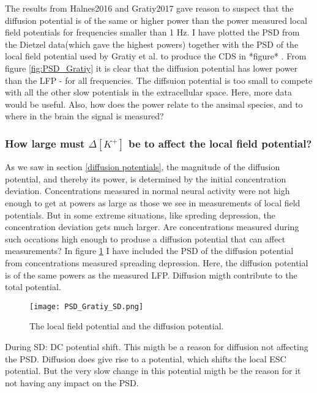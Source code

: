 \documentclass{article}
\begin{document}
The results from Halnes2016 and Gratiy2017 gave reason to suspect that the diffusion potential is of the same or higher power than the power measured local field potentials for frequencies smaller than 1 Hz. I have plotted the PSD from the Dietzel data(which gave the highest powers) together with the PSD of the local field potential used by Gratiy et al. to produce the CDS in *figure* . From figure \ref{fig:PSD_Gratiy} it is clear that the diffusion potential has lower power than the LFP  - for all frequencies. The diffsuion potential is too small to compete with all the other slow potentials in the extracellular space. Here, more data would be useful. Also, how does the power relate to the ansimal species, and to where in the brain the signal is measured?
\subsubsection{How large must $\Delta [K^+]$ be to affect the local field potential?}
As we saw in section \ref{diffusion potentials}, the magnitude of the diffusion potential, and thereby its power, is determined by the initial concentration deviation. Concentrations measured in normal neural activity were not high enough to get at powers as large as those we see in measurements of local field potentials. But in some extreme situations, like spreding depression, the concentration deviation gets much larger. Are concentrations measured during such occations high enough to produse a diffusion potential that can affect measurements? In figure \ref{fig:PSD_Gratiy_SD} I have included the PSD of the diffusion potential from concentrations measured spreading depression. Here, the diffusion potential is of the same powers as the measured  LFP. Diffusion migth contribute to the total potential. 

\begin{figure}
  \texttt{[image: PSD\_Gratiy\_SD.png]}
  \caption{The local field potential and the diffusion potential. }
  \label{fig:PSD_Gratiy_SD}
\end{figure}

During SD: DC potential shift. This migth be a reason for diffusion not affecting the PSD. Diffusion does give rise to a potential, which shifts the local ESC potential. But the very slow change in this potential migth be the reason for it not having any impact on the PSD.
\end{document}

